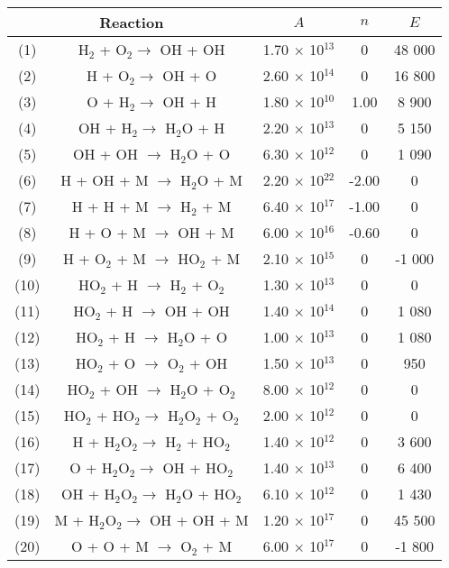 \documentclass{warpdoc}
\renewcommand{\fontsizetable}{\footnotesize\scalefont{0.9}}
\begin{document}
%
\begin{table}[t]
\fontsizetable
\begin{center}
\begin{threeparttable}
\begin{tabular}{ccccc} 
\toprule
\multicolumn{2}{c}{Reaction} & $A$ & $n$ & $E$  \\ 
\midrule
(1) & H$_{2}$ + O$_{2} \rightarrow$ OH + OH & 1.70 $\times$ 10$^{13}$ & 0 & 48 000 \\
(2) & H + O$_{2} \rightarrow$ OH + O & 2.60 $\times$ 10$^{14}$ & 0 & 16 800 \\
(3) & O + H$_{2} \rightarrow$ OH + H & 1.80 $\times$ 10$^{10}$ & 1.00 & 8 900 \\
(4) & OH + H$_{2} \rightarrow$ H$_{2}$O + H & 2.20 $\times$ 10$^{13}$ & 0 & 5 150 \\
(5) & OH + OH $\rightarrow$ H$_{2}$O + O & 6.30 $\times$ 10$^{12}$ & 0 & 1 090 \\
(6) & H + OH + M $\rightarrow$ H$_{2}$O + M & 2.20 $\times$ 10$^{22}$ & -2.00 & 0 \\
(7) & H + H + M $\rightarrow$ H$_{2}$ + M & 6.40 $\times$ 10$^{17}$ & -1.00 & 0 \\
(8) & H + O + M $\rightarrow$ OH + M & 6.00 $\times$ 10$^{16}$ & -0.60 & 0 \\
(9) & H + O$_{2}$ + M $\rightarrow$ HO$_{2}$ + M & 2.10 $\times$ 10$^{15}$ & 0 & -1 000 \\
(10) & HO$_{2}$ + H $\rightarrow$ H$_{2}$ + O$_{2}$ & 1.30 $\times$ 10$^{13}$ & 0 & 0 \\
(11) & HO$_{2}$ + H $\rightarrow$ OH + OH & 1.40 $\times$ 10$^{14}$ & 0 & 1 080 \\
(12) & HO$_{2}$ + H $\rightarrow$ H$_{2}$O + O & 1.00 $\times$ 10$^{13}$ & 0 & 1 080 \\
(13) & HO$_{2}$ + O $\rightarrow$ O$_{2}$ + OH & 1.50 $\times$ 10$^{13}$ & 0 &  950 \\
(14) & HO$_{2}$ + OH $\rightarrow$ H$_{2}$O + O$_{2}$ & 8.00 $\times$ 10$^{12}$ & 0 & 0 \\
(15) & HO$_{2}$ + HO$_{2} \rightarrow$ H$_{2}$O$_{2}$ + O$_{2}$ & 2.00 $\times$ 10$^{12}$ & 0 & 0 \\
(16) & H + H$_{2}$O$_{2} \rightarrow$ H$_{2}$ + HO$_{2}$ & 1.40 $\times$ 10$^{12}$ & 0 & 3 600 \\
(17) & O + H$_{2}$O$_{2} \rightarrow$ OH + HO$_{2}$ & 1.40 $\times$ 10$^{13}$ & 0 & 6 400 \\
(18) & OH + H$_{2}$O$_{2} \rightarrow$ H$_{2}$O + HO$_{2}$ & 6.10 $\times$ 10$^{12}$ & 0 & 1 430 \\
(19) & M + H$_{2}$O$_{2} \rightarrow$ OH + OH + M & 1.20 $\times$ 10$^{17}$ & 0 & 45 500 \\
(20) & O + O + M $\rightarrow$ O$_{2}$ + M & 6.00 $\times$ 10$^{17}$ & 0 & -1 800 \\
\bottomrule
\end{tabular}
\label{tab:jachimowsky}
\end{threeparttable}
\end{center}
\end{table}
\end{document}
